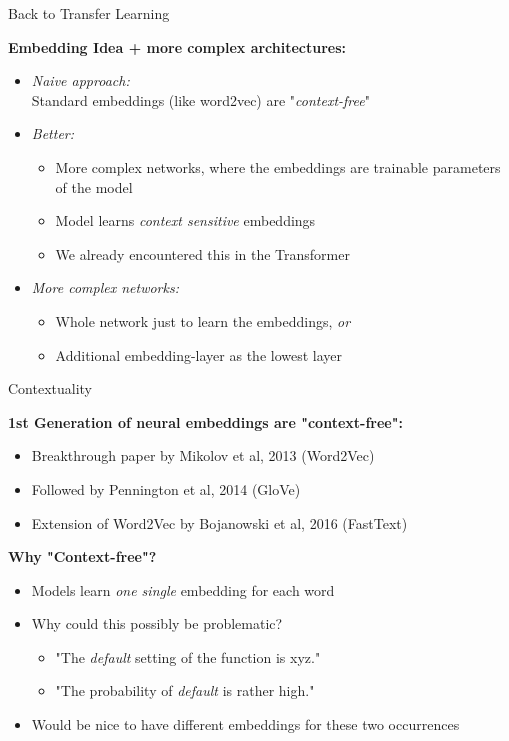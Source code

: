 \documentclass[]{beamer}
\begin{document}
\begin{frame}{Back to Transfer Learning}

	\textbf{Embedding Idea + more complex architectures:}

	\begin{itemize}
		\item \textit{Naive approach:}\\
					Standard embeddings (like word2vec) are "\textit{context-free}"
		\item \textit{Better:}\\
			\begin{itemize}
				\item More complex networks, where the embeddings are trainable parameters of the model
				\item Model learns \textit{context sensitive} embeddings 
				\item We already encountered this in the Transformer
			\end{itemize}
		\item \textit{More complex networks:}\\
			\begin{itemize}
				\item Whole network just to learn the embeddings, \textit{or}
				\item Additional embedding-layer as the lowest layer
			\end{itemize}
	\end{itemize}
\end{frame}



\begin{frame}{Contextuality}

	\textbf{1st Generation of neural embeddings are "context-free":}

	\begin{itemize}
		\item Breakthrough paper by Mikolov et al, 2013 (Word2Vec)
		\item Followed by Pennington et al, 2014 (GloVe)
		\item Extension of Word2Vec by Bojanowski et al, 2016 (FastText)
	\end{itemize}
	
	\vspace{.3cm}
	
	\textbf{Why "Context-free"?}
	
	\begin{itemize}
		\item Models learn \textit{one single} embedding for each word
		\item Why could this possibly be problematic?
			\begin{itemize}
				\item "The \textit{default} setting of the function is xyz."
				\item "The probability of \textit{default} is rather high."
			\end{itemize}
		\item Would be nice to have different embeddings for these two occurrences
	\end{itemize}
\end{frame}
\end{document}
